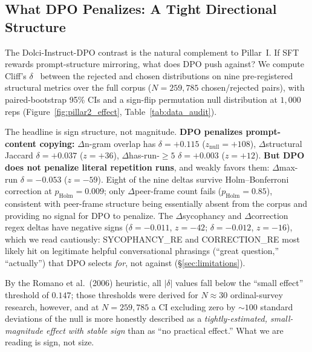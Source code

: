 \documentclass[11pt]{article}
\begin{document}
\subsection{What DPO Penalizes: A Tight Directional Structure}
\label{sec:pillar2}

\noindent The Dolci-Instruct-DPO contrast is the natural complement to Pillar~I. If SFT rewards prompt-structure mirroring, what does DPO push against? We compute Cliff's $\delta$~\citep{cliff1993dominance} between the rejected and chosen distributions on nine pre-registered structural metrics over the full corpus ($N{=}259{,}785$ chosen/rejected pairs), with paired-bootstrap 95\% CIs and a sign-flip permutation null distribution at $1{,}000$ reps (Figure~\ref{fig:pillar2_effect}, Table~\ref{tab:data_audit}).

The headline is sign structure, not magnitude. \textbf{DPO penalizes prompt-content copying:} $\Delta$n-gram overlap has $\delta{=}{+}0.115$ ($z_{\text{null}}{=}{+}108$), $\Delta$structural Jaccard $\delta{=}{+}0.037$ ($z{=}{+}36$), $\Delta$has-run-$\geq 5$ $\delta{=}{+}0.003$ ($z{=}{+}12$). \textbf{But DPO does not penalize literal repetition runs}, and weakly favors them: $\Delta$max-run $\delta{=}{-}0.053$ ($z{=}{-}59$). Eight of the nine deltas survive Holm--Bonferroni correction at $p_{\text{Holm}}{=}0.009$; only $\Delta$peer-frame count fails ($p_{\text{Holm}}{=}0.85$), consistent with peer-frame structure being essentially absent from the corpus and providing no signal for DPO to penalize. The $\Delta$sycophancy and $\Delta$correction regex deltas have negative signs ($\delta{=}{-}0.011$, $z{=}{-}42$; $\delta{=}{-}0.012$, $z{=}{-}16$), which we read cautiously: \textsc{SYCOPHANCY\_RE} and \textsc{CORRECTION\_RE} most likely hit on legitimate helpful conversational phrasings (``great question,'' ``actually'') that DPO selects \emph{for}, not against (\S\ref{sec:limitations}).

By the Romano et al.~(2006) heuristic, all $|\delta|$ values fall below the ``small effect'' threshold of $0.147$; those thresholds were derived for $N{\approx}30$ ordinal-survey research, however, and at $N{=}259{,}785$ a CI excluding zero by $\sim 100$ standard deviations of the null is more honestly described as a \emph{tightly-estimated, small-magnitude effect with stable sign} than as ``no practical effect.'' What we are reading is sign, not size.
\end{document}
